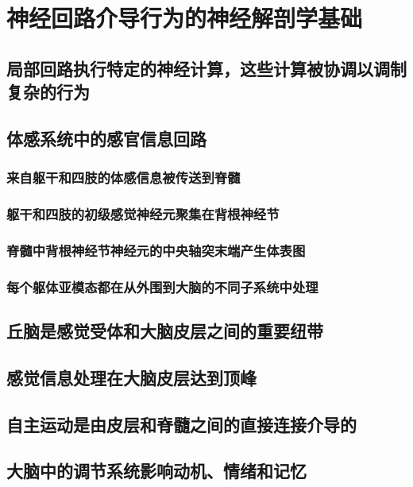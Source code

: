 \chapter{神经回路介导行为的神经解剖学基础}

\section{局部回路执行特定的神经计算，这些计算被协调以调制复杂的行为}


\section{体感系统中的感官信息回路}
\subsection{来自躯干和四肢的体感信息被传送到脊髓}
\subsection{躯干和四肢的初级感觉神经元聚集在背根神经节}
\subsection{脊髓中背根神经节神经元的中央轴突末端产生体表图}
\subsection{每个躯体亚模态都在从外围到大脑的不同子系统中处理}

\section{丘脑是感觉受体和大脑皮层之间的重要纽带}

\section{感觉信息处理在大脑皮层达到顶峰}

\section{自主运动是由皮层和脊髓之间的直接连接介导的}

\section{大脑中的调节系统影响动机、情绪和记忆}

